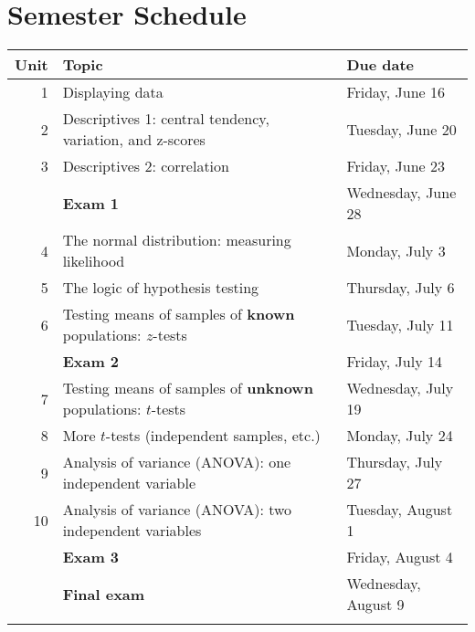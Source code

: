 \documentclass[10pt]{article}
\begin{document}
\section*{Semester Schedule}
\label{sec-11}
\begin{center}
\begin{tabular}{rll}
Unit & Topic & Due date\\
\hline
1 & Displaying data & Friday, June 16\\
2 & Descriptives 1: central tendency, variation, and z-scores & Tuesday, June 20\\
3 & Descriptives 2: correlation & Friday, June 23\\
 & \textbf{Exam 1} & Wednesday, June 28\\
4 & The normal distribution: measuring likelihood & Monday, July 3\\
5 & The logic of hypothesis testing & Thursday, July 6\\
6 & Testing means of samples of \textbf{known} populations: $z$-tests & Tuesday, July 11\\
 & \textbf{Exam 2} & Friday, July 14\\
7 & Testing means of samples of \textbf{unknown} populations: $t$-tests & Wednesday, July 19\\
8 & More $t$-tests (independent samples, etc.) & Monday, July 24\\
9 & Analysis of variance (ANOVA): one independent variable & Thursday, July 27\\
10 & Analysis of variance (ANOVA): two independent variables & Tuesday, August 1\\
 & \textbf{Exam 3} & Friday, August 4\\
 & \textbf{Final exam} & Wednesday, August 9\\
 &  & \\
\end{tabular}
\end{center}
\end{document}
